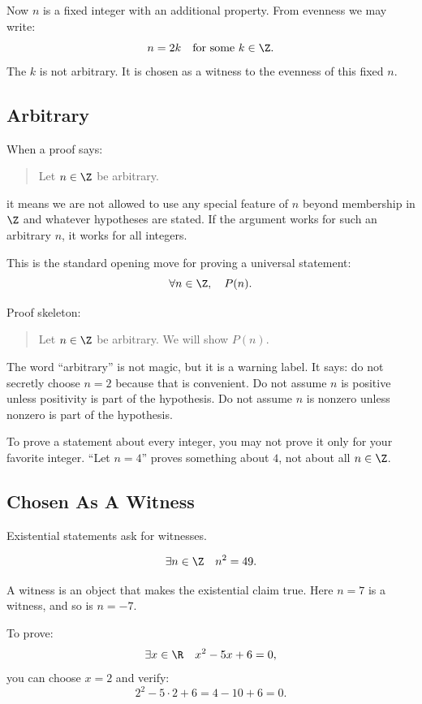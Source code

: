 Now $n$ is a fixed integer with an additional property. From evenness we may write:
\[
n=2k\quad\text{for some }k\in\Z.
\]
The $k$ is not arbitrary. It is chosen as a witness to the evenness of this fixed $n$.

\subsection{Arbitrary}

When a proof says:

\begin{quote}
Let $n\in\Z$ be arbitrary.
\end{quote}

it means we are not allowed to use any special feature of $n$ beyond membership in $\Z$ and whatever hypotheses are stated. If the argument works for such an arbitrary $n$, it works for all integers.

This is the standard opening move for proving a universal statement:
\[
\forall n\in\Z,\quad P(n).
\]

Proof skeleton:

\begin{quote}
Let $n\in\Z$ be arbitrary. We will show $P(n)$.
\end{quote}

The word ``arbitrary'' is not magic, but it is a warning label. It says: do not secretly choose $n=2$ because that is convenient. Do not assume $n$ is positive unless positivity is part of the hypothesis. Do not assume $n$ is nonzero unless nonzero is part of the hypothesis.

\begin{trapbox}
To prove a statement about every integer, you may not prove it only for your favorite integer. ``Let $n=4$'' proves something about $4$, not about all $n\in\Z$.
\end{trapbox}

\subsection{Chosen As A Witness}

Existential statements ask for witnesses.

\[
\exists n\in\Z\quad n^2=49.
\]

A witness is an object that makes the existential claim true. Here $n=7$ is a witness, and so is $n=-7$.

To prove:
\[
\exists x\in\R\quad x^2-5x+6=0,
\]
you can choose $x=2$ and verify:
\[
2^2-5\cdot2+6=4-10+6=0.
\]

